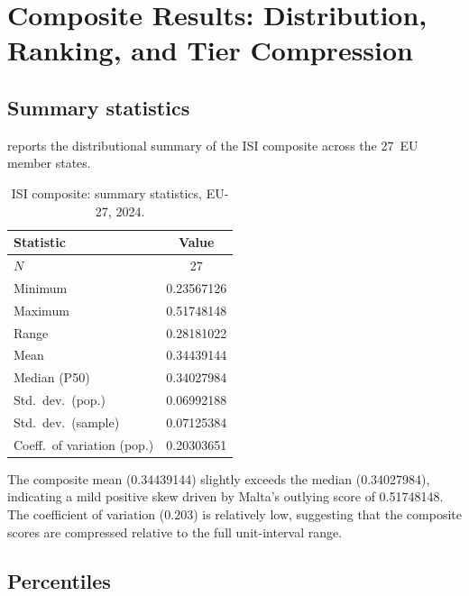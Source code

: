 \section{Composite Results: Distribution, Ranking, and Tier
  Compression}\label{sec:composite-results}

\subsection{Summary statistics}

 reports the distributional summary of the
ISI composite across the 27~EU member states.

\begin{table}[htbp]
\centering
\caption{ISI composite: summary statistics, EU-27, 2024.}
\label{tab:summary-stats}
\begin{tabular}{@{}lS[table-format=1.8]@{}}
\toprule
\textbf{Statistic} & {\textbf{Value}} \\
\midrule
$N$                         & 27 \\
Minimum                     & 0.23567126 \\
Maximum                     & 0.51748148 \\
Range                       & 0.28181022 \\
Mean                        & 0.34439144 \\
Median (P50)                & 0.34027984 \\
Std.\ dev.\ (pop.)         & 0.06992188 \\
Std.\ dev.\ (sample)       & 0.07125384 \\
Coeff.\ of variation (pop.) & 0.20303651 \\
\bottomrule
\end{tabular}
\end{table}

The composite mean (\num{0.34439144}) slightly exceeds the median
(\num{0.34027984}), indicating a mild positive skew driven by Malta's
outlying score of \num{0.51748148}.  The coefficient of variation
(0.203) is relatively low, suggesting that the composite scores are
compressed relative to the full unit-interval range.

\subsection{Percentiles}

